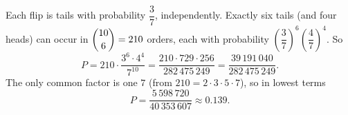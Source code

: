 Each flip is tails with probability $\dfrac{3}{7}$, independently. Exactly six tails (and four heads) can occur in $\dbinom{10}{6}=210$ orders, each with probability $\left(\dfrac{3}{7}\right)^6\left(\dfrac{4}{7}\right)^4$. So
\[
P=210\cdot\dfrac{3^6\cdot4^4}{7^{10}}=\dfrac{210\cdot729\cdot256}{282\,475\,249}=\dfrac{39\,191\,040}{282\,475\,249}.
\]
The only common factor is one $7$ (from $210=2\cdot3\cdot5\cdot7$), so in lowest terms
\[
P=\boxed{\dfrac{5\,598\,720}{40\,353\,607}}\approx0.139 .
\]
